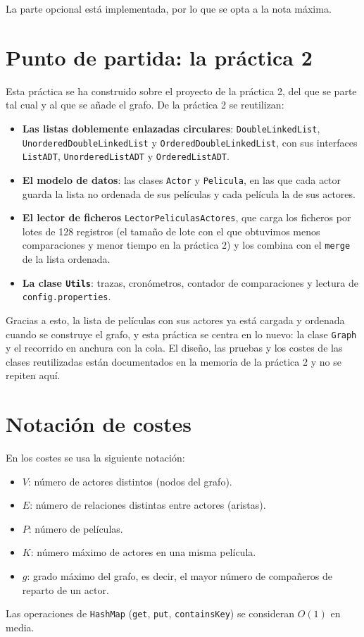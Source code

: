 \documentclass[a4paper,11pt]{report}
\begin{document}
La parte opcional está implementada, por lo que se opta a la nota máxima.

\section{Punto de partida: la práctica 2}

Esta práctica se ha construido sobre el proyecto de la práctica 2, del que se parte tal cual y al que se añade el grafo. De la práctica 2 se reutilizan:

\begin{itemize}
    \item \textbf{Las listas doblemente enlazadas circulares}: \texttt{DoubleLinkedList}, \texttt{Unordered\allowbreak Double\allowbreak Linked\allowbreak List} y \texttt{Ordered\allowbreak Double\allowbreak Linked\allowbreak List}, con sus interfaces \texttt{ListADT}, \texttt{Unordered\allowbreak ListADT} y \texttt{OrderedListADT}.
    \item \textbf{El modelo de datos}: las clases \texttt{Actor} y \texttt{Pelicula}, en las que cada actor guarda la lista no ordenada de sus películas y cada película la de sus actores.
    \item \textbf{El lector de ficheros} \texttt{LectorPeliculasActores}, que carga los ficheros por lotes de 128 registros (el tamaño de lote con el que obtuvimos menos comparaciones y menor tiempo en la práctica 2) y los combina con el \texttt{merge} de la lista ordenada.
    \item \textbf{La clase \texttt{Utils}}: trazas, cronómetros, contador de comparaciones y lectura de \texttt{config.properties}.
\end{itemize}

Gracias a esto, la lista de películas con sus actores ya está cargada y ordenada cuando se construye el grafo, y esta práctica se centra en lo nuevo: la clase \texttt{Graph} y el recorrido en anchura con la cola. El diseño, las pruebas y los costes de las clases reutilizadas están documentados en la memoria de la práctica 2 y no se repiten aquí.

\section{Notación de costes}
En los costes se usa la siguiente notación:
\begin{itemize}
    \item $V$: número de actores distintos (nodos del grafo).
    \item $E$: número de relaciones distintas entre actores (aristas).
    \item $P$: número de películas.
    \item $K$: número máximo de actores en una misma película.
    \item $g$: grado máximo del grafo, es decir, el mayor número de compañeros de reparto de un actor.
\end{itemize}
Las operaciones de \texttt{HashMap} (\texttt{get}, \texttt{put}, \texttt{containsKey}) se consideran $O(1)$ en media.
\end{document}
